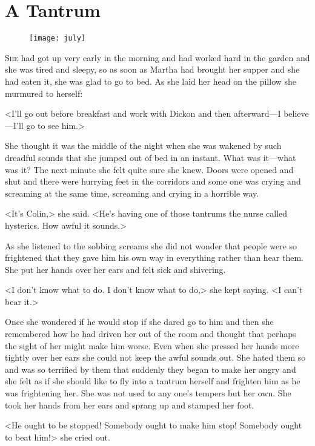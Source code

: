 \chapter{A Tantrum} 
	
\begin{figure}[t!]
\centering
\texttt{[image: july]}
\end{figure}

 \lettrine[]{S}{he} had got up very early in the morning and had worked hard in the garden and she was tired and sleepy, so as soon as Martha had brought her supper and she had eaten it, she was glad to go to bed. As she laid her head on the pillow she murmured to herself:

\zz
<I'll go out before breakfast and work with Dickon and then afterward—I believe—I'll go to see him.>

She thought it was the middle of the night when she was wakened by such dreadful sounds that she jumped out of bed in an instant. What was it—what was it? The next minute she felt quite sure she knew. Doors were opened and shut and there were hurrying feet in the corridors and some one was crying and screaming at the same time, screaming and crying in a horrible way.

<It's Colin,> she said. <He's having one of those tantrums the nurse called hysterics. How awful it sounds.>

As she listened to the sobbing screams she did not wonder that people were so frightened that they gave him his own way in everything rather than hear them. She put her hands over her ears and felt sick and shivering.

<I don't know what to do. I don't know what to do,> she kept saying. <I can't bear it.>

Once she wondered if he would stop if she dared go to him and then she remembered how he had driven her out of the room and thought that perhaps the sight of her might make him worse. Even when she pressed her hands more tightly over her ears she could not keep the awful sounds out. She hated them so and was so terrified by them that suddenly they began to make her angry and she felt as if she should like to fly into a tantrum herself and frighten him as he was frightening her. She was not used to any one's tempers but her own. She took her hands from her ears and sprang up and stamped her foot.

<He ought to be stopped! Somebody ought to make him stop! Somebody ought to beat him!> she cried out.

